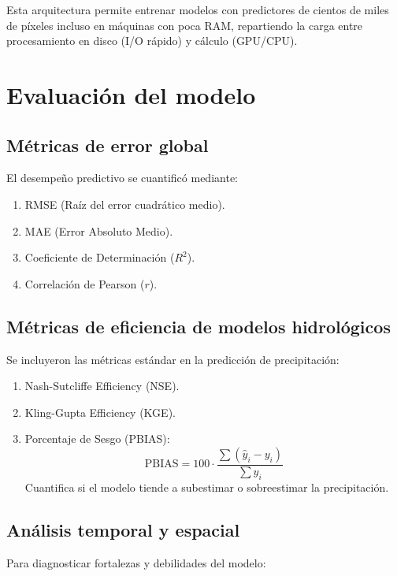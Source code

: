 Esta arquitectura permite entrenar modelos con predictores de cientos de miles de píxeles incluso en máquinas con poca RAM, repartiendo la carga entre procesamiento en disco (I/O rápido) y cálculo (GPU/CPU).


\section{Evaluación del modelo}
\label{sec:evaluacion_modelo}

\subsection{Métricas de error global}
El desempeño predictivo se cuantificó mediante:

\begin{enumerate}
    \item RMSE (Raíz del error cuadrático medio).
    \item MAE (Error Absoluto Medio).
    \item Coeficiente de Determinación ($R^2$).
    \item Correlación de Pearson ($r$).
\end{enumerate}

\subsection{Métricas de eficiencia de modelos hidrológicos}
Se incluyeron las métricas estándar en la predicción de precipitación:

\begin{enumerate}
    \item Nash-Sutcliffe Efficiency (NSE).
    \item Kling-Gupta Efficiency (KGE). 
    \item Porcentaje de Sesgo (PBIAS):
    \begin{equation}
        \text{PBIAS} = 100 \cdot \frac{\sum (\hat{y}_i - y_i)}{\sum y_i}
    \end{equation}
    Cuantifica si el modelo tiende a subestimar o sobreestimar la precipitación.
\end{enumerate}

\subsection{Análisis temporal y espacial}
Para diagnosticar fortalezas y debilidades del modelo:

